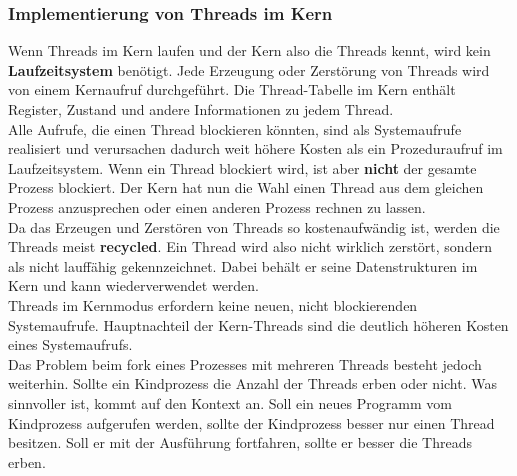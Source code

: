 \documentclass[12pt,a4paper]{univention}
\begin{document}
\subsubsection{Implementierung von Threads im Kern}
Wenn Threads im Kern laufen und der Kern also die Threads kennt, wird kein \textbf{Laufzeitsystem} benötigt. Jede Erzeugung oder Zerstörung von Threads wird von einem Kernaufruf durchgeführt. Die Thread-Tabelle im Kern enthält Register, Zustand und andere Informationen zu jedem Thread.\\
Alle Aufrufe, die einen Thread blockieren könnten, sind als Systemaufrufe realisiert und verursachen dadurch weit höhere Kosten als ein Prozeduraufruf im Laufzeitsystem. Wenn ein Thread blockiert wird, ist aber \textbf{nicht} der gesamte Prozess blockiert. Der Kern hat nun die Wahl einen Thread aus dem gleichen Prozess anzusprechen oder einen anderen Prozess rechnen zu lassen.\\
Da das Erzeugen und Zerstören von Threads so kostenaufwändig ist, werden die Threads meist \textbf{recycled}. Ein Thread wird also nicht wirklich zerstört, sondern als nicht lauffähig gekennzeichnet. Dabei behält er seine Datenstrukturen im Kern und kann wiederverwendet werden. \\
Threads im Kernmodus erfordern keine neuen, nicht blockierenden Systemaufrufe. Hauptnachteil der Kern-Threads sind die deutlich höheren Kosten eines Systemaufrufs.\\
Das Problem beim fork eines Prozesses mit mehreren Threads besteht jedoch weiterhin. Sollte ein Kindprozess die Anzahl der Threads erben oder nicht. Was sinnvoller ist, kommt auf den Kontext an. Soll ein neues Programm vom Kindprozess aufgerufen werden, sollte der Kindprozess besser nur einen Thread besitzen. Soll er mit der Ausführung fortfahren, sollte er besser die Threads erben.
\end{document}
